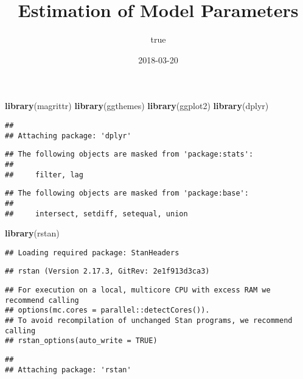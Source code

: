 \documentclass[11pt,]{article}
\title{Estimation of Model Parameters}
\author{true}
\date{2018-03-20}
\newenvironment{Shaded}{\begin{snugshade}}{\end{snugshade}}
\newcommand{\KeywordTok}[1]{\textcolor[rgb]{0.13,0.29,0.53}{\textbf{#1}}}
\newcommand{\NormalTok}[1]{#1}
\begin{document}
\maketitle

\begin{Shaded}
\begin{Highlighting}[]
\KeywordTok{library}\NormalTok{(magrittr)}
\KeywordTok{library}\NormalTok{(ggthemes)}
\KeywordTok{library}\NormalTok{(ggplot2)}
\KeywordTok{library}\NormalTok{(dplyr)}
\end{Highlighting}
\end{Shaded}

\begin{verbatim}
## 
## Attaching package: 'dplyr'
\end{verbatim}

\begin{verbatim}
## The following objects are masked from 'package:stats':
## 
##     filter, lag
\end{verbatim}

\begin{verbatim}
## The following objects are masked from 'package:base':
## 
##     intersect, setdiff, setequal, union
\end{verbatim}

\begin{Shaded}
\begin{Highlighting}[]
\KeywordTok{library}\NormalTok{(rstan)}
\end{Highlighting}
\end{Shaded}

\begin{verbatim}
## Loading required package: StanHeaders
\end{verbatim}

\begin{verbatim}
## rstan (Version 2.17.3, GitRev: 2e1f913d3ca3)
\end{verbatim}

\begin{verbatim}
## For execution on a local, multicore CPU with excess RAM we recommend calling
## options(mc.cores = parallel::detectCores()).
## To avoid recompilation of unchanged Stan programs, we recommend calling
## rstan_options(auto_write = TRUE)
\end{verbatim}

\begin{verbatim}
## 
## Attaching package: 'rstan'
\end{verbatim}
\end{document}
